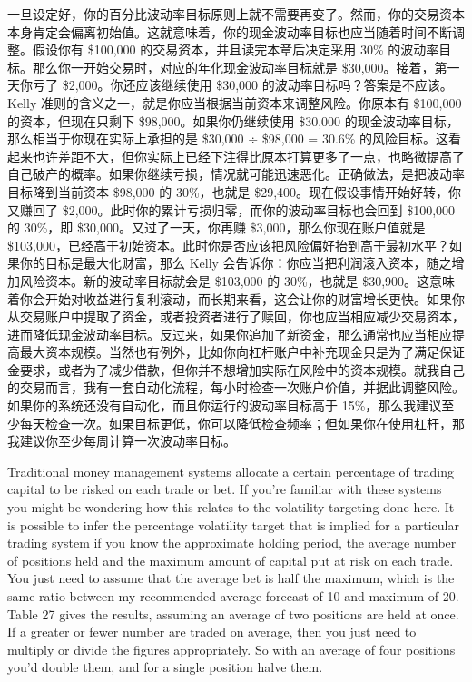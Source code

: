 \begin{chineseblock}一旦设定好，你的百分比波动率目标原则上就不需要再变了。然而，你的交易资本本身肯定会偏离初始值。这就意味着，你的现金波动率目标也应当随着时间不断调整。假设你有 \$100,000 的交易资本，并且读完本章后决定采用 30\% 的波动率目标。那么你一开始交易时，对应的年化现金波动率目标就是 \$30,000。接着，第一天你亏了 \$2,000。你还应该继续使用 \$30,000 的波动率目标吗？答案是不应该。Kelly 准则的含义之一，就是你应当根据当前资本来调整风险。你原本有 \$100,000 的资本，但现在只剩下 \$98,000。如果你仍继续使用 \$30,000 的现金波动率目标，那么相当于你现在实际上承担的是 \$30,000 ÷ \$98,000 = 30.6\% 的风险目标。这看起来也许差距不大，但你实际上已经下注得比原本打算更多了一点，也略微提高了自己破产的概率。如果你继续亏损，情况就可能迅速恶化。正确做法，是把波动率目标降到当前资本 \$98,000 的 30\%，也就是 \$29,400。现在假设事情开始好转，你又赚回了 \$2,000。此时你的累计亏损归零，而你的波动率目标也会回到 \$100,000 的 30\%，即 \$30,000。又过了一天，你再赚 \$3,000，那么你现在账户值就是 \$103,000，已经高于初始资本。此时你是否应该把风险偏好抬到高于最初水平？如果你的目标是最大化财富，那么 Kelly 会告诉你：你应当把利润滚入资本，随之增加风险资本。新的波动率目标就会是 \$103,000 的 30\%，也就是 \$30,900。这意味着你会开始对收益进行复利滚动，而长期来看，这会让你的财富增长更快。如果你从交易账户中提取了资金，或者投资者进行了赎回，你也应当相应减少交易资本，进而降低现金波动率目标。反过来，如果你追加了新资金，那么通常也应当相应提高最大资本规模。当然也有例外，比如你向杠杆账户中补充现金只是为了满足保证金要求，或者为了减少借款，但你并不想增加实际在风险中的资本规模。就我自己的交易而言，我有一套自动化流程，每小时检查一次账户价值，并据此调整风险。如果你的系统还没有自动化，而且你运行的波动率目标高于 15\%，那么我建议至少每天检查一次。如果目标更低，你可以降低检查频率；但如果你在使用杠杆，那我建议你至少每周计算一次波动率目标。\end{chineseblock}


\begin{englishblock} Traditional money management systems allocate a certain percentage of trading capital to be risked on each trade or bet. If you're familiar with these systems you might be wondering how this relates to the volatility targeting done here. It is possible to infer the percentage volatility target that is implied for a particular trading system if you know the approximate holding period, the average number of positions held and the maximum amount of capital put at risk on each trade. You just need to assume that the average bet is half the maximum, which is the same ratio between my recommended average forecast of 10 and maximum of 20. Table 27 gives the results, assuming an average of two positions are held at once. If a greater or fewer number are traded on average, then you just need to multiply or divide the figures appropriately. So with an average of four positions you'd double them, and for a single position halve them. \end{englishblock}

